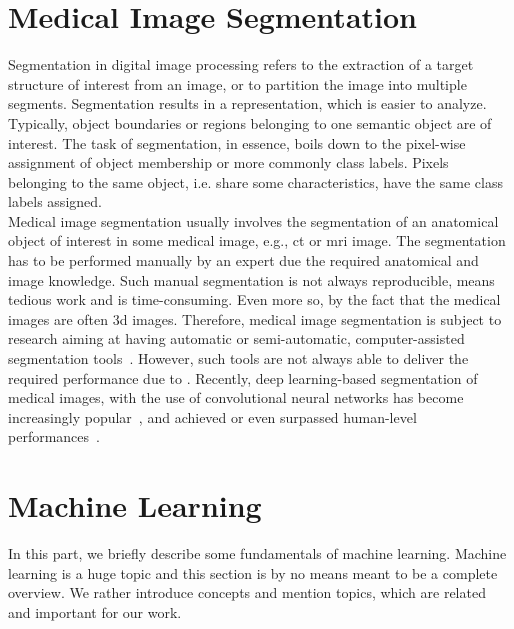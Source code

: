 \section{Medical Image Segmentation} \label{sec:intro_mia} %
Segmentation in digital image processing refers to the extraction of a target structure of interest from an image, or to partition the image into multiple segments. Segmentation results in a representation, which is easier to analyze. Typically, object boundaries or regions belonging to one semantic object are of interest. The task of segmentation, in essence, boils down to the pixel-wise assignment of object membership or more commonly class labels. Pixels belonging to the same object, i.e. share some characteristics, have the same class labels assigned.\\
Medical image segmentation usually involves the segmentation of an anatomical object of interest in some medical image, e.g., \gls{ct} or \gls{mri} image. The segmentation has to be performed manually by an expert due the required anatomical and image knowledge. Such manual segmentation is not always reproducible, means tedious work and is time-consuming. Even more so, by the fact that the medical images are often \gls{3d} images. Therefore, medical image segmentation is subject to research aiming at having automatic or semi-automatic, computer-assisted segmentation tools~\cite{doi:10.1146/annurev.bioeng.2.1.315,doi:10.1080/10255840903131878}. However, such tools are not always able to deliver the required performance due to . Recently, deep learning-based segmentation of medical images, with the use of convolutional neural networks has become increasingly popular~\cite{Ronneberger2015U-Net:Segmentation,Tetteh2018DeepVesselNet:Volumes,Cicek20163DAnnotation,Baumgartner2017AnSegmentation,Meng2017TrackingNetwork,Milletari2016V-Net:Segmentation,BalsigerContext-awareNeurography,Kayalibay2017CNN-basedData}, and achieved or even surpassed human-level performances~\cite{He2014DelvingClassification}.

\section{Machine Learning} \label{sec:intro_mlearn} %
In this part, we briefly describe some fundamentals of machine learning. Machine learning is a huge topic and this section is by no means meant to be a complete overview. We rather introduce concepts and mention topics, which are related and important for our work.

